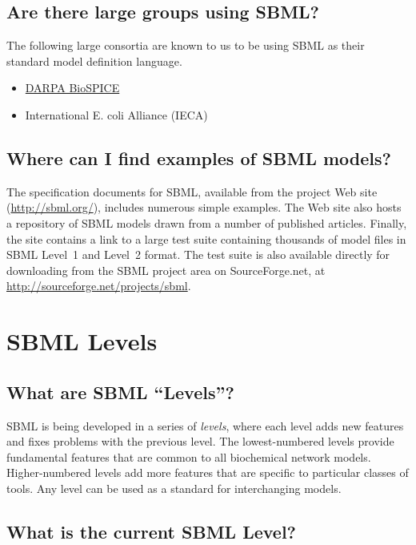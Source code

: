 \documentclass{sbmlfaq}
\begin{document}
\subsection{Are there large groups using SBML?}

The following large consortia are known to us to be using SBML as their
standard model definition language.
\begin{itemize}\setlength{\parskip}{-1ex}
\item \href{https://community.biospice.org/}{DARPA BioSPICE}
\item International E. coli Alliance (IECA)
\end{itemize}


\subsection{Where can I find examples of SBML models?}

The specification documents for SBML, available from the project Web site
(\href{http://sbml.org/}{http://sbml.org/}), includes numerous simple
examples.  The Web site also hosts a repository of SBML models drawn from a
number of published articles.  Finally, the site contains a link to a large
test suite containing thousands of model files in SBML Level~1 and Level~2
format.  The test suite is also available directly for downloading from the
SBML project area on SourceForge.net, at
\url{http://sourceforge.net/projects/sbml}.


\section{SBML Levels}
\label{sec:sbml-levels}

\subsection{What are SBML ``Levels''?}

SBML is being developed in a series of \emph{levels}, where each level adds
new features and fixes problems with the previous level.  The
lowest-numbered levels provide fundamental features that are common to all
biochemical network models.  Higher-numbered levels add more features that
are specific to particular classes of tools.  Any level can be used as a
standard for interchanging models.

\subsection{What is the current SBML Level?}
\end{document}
